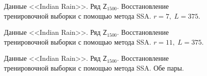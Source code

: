 \documentclass[specialist,
               substylefile = spbu.rtx,
               subf,href,colorlinks=true, 12p]{disser}
\begin{document}
\begin{figure}[H]
	\captionsetup{justification=centering}
	\caption{Данные <<Indian Rain>>. Ряд $\mathsf{Z}_{1500}$. Восстановление тренировочной выборки с помощью метода SSA. $r = 7, \; L = 375$.}
	\label{indian_rec_r7}
\end{figure}

\begin{figure}[H]
	\captionsetup{justification=centering}
	\caption{Данные <<Indian Rain>>. Ряд $\mathsf{Z}_{1500}$. Восстановление тренировочной выборки с помощью метода SSA. $r = 11, \; L = 375$.}
	\label{indian_rec_r11}
\end{figure}

\begin{figure}[H]
	\captionsetup{justification=centering}
	\caption{Данные <<Indian Rain>>. Ряд $\mathsf{Z}_{1500}$. Восстановление тренировочной выборки с помощью метода SSA. Обе пары.}
	\label{indian_rec_rboth}
\end{figure}
\end{document}
